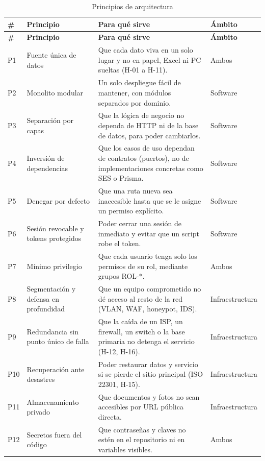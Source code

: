 \begin{longtable}{|>{\centering\arraybackslash}p{0.9cm}|>{\raggedright\arraybackslash}p{3.6cm}|>{\raggedright\arraybackslash}p{7.6cm}|>{\raggedright\arraybackslash}p{2.3cm}|}
\caption{Principios de arquitectura}\label{tab:principios}\\
\hline
\textbf{\#} & \textbf{Principio} & \textbf{Para qué sirve} & \textbf{Ámbito} \\
\hline
\endfirsthead
\hline
\textbf{\#} & \textbf{Principio} & \textbf{Para qué sirve} & \textbf{Ámbito} \\
\hline
\endhead
P1 & Fuente única de datos & Que cada dato viva en un solo lugar y no en papel, Excel ni PC sueltas (H-01 a H-11). & Ambos \\
\hline
P2 & Monolito modular & Un solo despliegue fácil de mantener, con módulos separados por dominio. & Software \\
\hline
P3 & Separación por capas & Que la lógica de negocio no dependa de HTTP ni de la base de datos, para poder cambiarlos. & Software \\
\hline
P4 & Inversión de dependencias & Que los casos de uso dependan de contratos (puertos), no de implementaciones concretas como SES o Prisma. & Software \\
\hline
P5 & Denegar por defecto & Que una ruta nueva sea inaccesible hasta que se le asigne un permiso explícito. & Software \\
\hline
P6 & Sesión revocable y tokens protegidos & Poder cerrar una sesión de inmediato y evitar que un script robe el token. & Software \\
\hline
P7 & Mínimo privilegio & Que cada usuario tenga solo los permisos de su rol, mediante grupos ROL-$*$. & Ambos \\
\hline
P8 & Segmentación y defensa en profundidad & Que un equipo comprometido no dé acceso al resto de la red (VLAN, WAF, honeypot, IDS). & Infraestructura \\
\hline
P9 & Redundancia sin punto único de falla & Que la caída de un ISP, un firewall, un switch o la base primaria no detenga el servicio (H-12, H-16). & Infraestructura \\
\hline
P10 & Recuperación ante desastres & Poder restaurar datos y servicio si se pierde el sitio principal (ISO 22301, H-15). & Infraestructura \\
\hline
P11 & Almacenamiento privado & Que documentos y fotos no sean accesibles por URL pública directa. & Infraestructura \\
\hline
P12 & Secretos fuera del código & Que contraseñas y claves no estén en el repositorio ni en variables visibles. & Ambos \\

\end{longtable}

